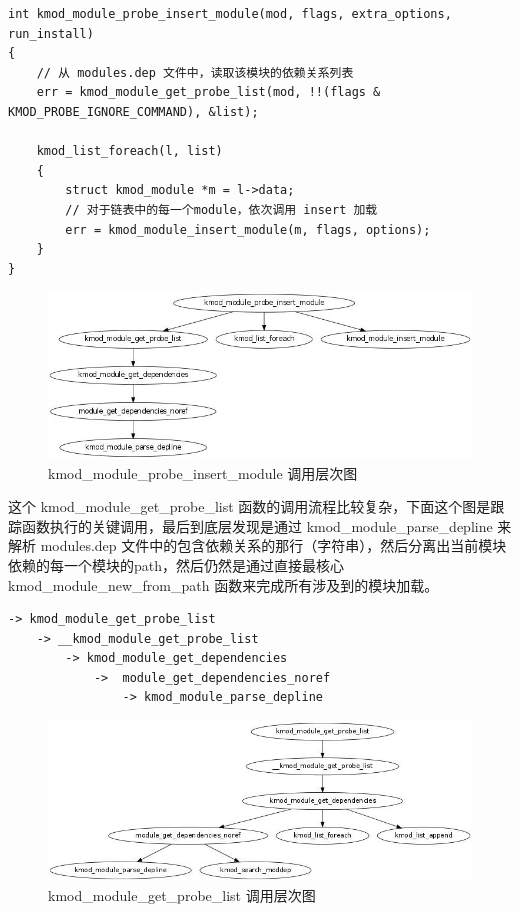 {\begin{shaded}\begin{verbatim}
int kmod_module_probe_insert_module(mod, flags, extra_options, run_install)
{
    // 从 modules.dep 文件中，读取该模块的依赖关系列表       
    err = kmod_module_get_probe_list(mod, !!(flags & KMOD_PROBE_IGNORE_COMMAND), &list);

    kmod_list_foreach(l, list) 
    {
        struct kmod_module *m = l->data;
        // 对于链表中的每一个module，依次调用 insert 加载
        err = kmod_module_insert_module(m, flags, options);
    }
}
\end{verbatim}\end{shaded}}
\begin{figure}[htbp]
\centering
\includegraphics{./figures/kmod_module_probe_insert_module.jpg}
\caption{kmod\_module\_probe\_insert\_module 调用层次图}
\end{figure}

这个 kmod\_module\_get\_probe\_list
函数的调用流程比较复杂，下面这个图是跟踪函数执行的关键调用，最后到底层发现是通过
kmod\_module\_parse\_depline 来解析 modules.dep
文件中的包含依赖关系的那行（字符串），然后分离出当前模块依赖的每一个模块的path，然后仍然是通过直接最核心
kmod\_module\_new\_from\_path 函数来完成所有涉及到的模块加载。

{\begin{shaded}\begin{verbatim}
-> kmod_module_get_probe_list
    -> __kmod_module_get_probe_list
        -> kmod_module_get_dependencies
            ->  module_get_dependencies_noref
                -> kmod_module_parse_depline
\end{verbatim}\end{shaded}}
\begin{figure}[htbp]
\centering
\includegraphics{./figures/kmod_module_get_probe_list.jpg}
\caption{kmod\_module\_get\_probe\_list 调用层次图}
\end{figure}

